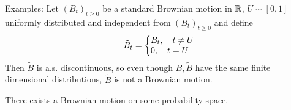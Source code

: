 \documentclass{article}
\begin{document}
\begin{examplesblock}{Examples: }\label{examples: 9}
	Let $ (B_{t})_{t\geq 0}$ be a standard Brownian motion in $ \mathbb{R}$, $ U\sim [0,1]$ uniformly distributed and independent from $ (B_{t})_{t\geq 0}$ and define
	\[
		\tilde{B}_{t} = \left\lbrace
	\begin{array}{@{}l@{}}
	    B_{t}, \quad  t\neq U \\
	    0, \quad t = U
	\end{array}\right.
	\]
	Then $ \tilde{B}$ is a.s. discontinuous, so even though $ B, \tilde{B}$ have the same finite dimensional distributions, $ \tilde{B}$ is \underline{not} a Brownian motion.
\end{examplesblock}

\begin{theorem}[Wiener]\label{thm: wiener BM}
There exists a Brownian motion on some probability space.
\end{theorem}
\end{document}
